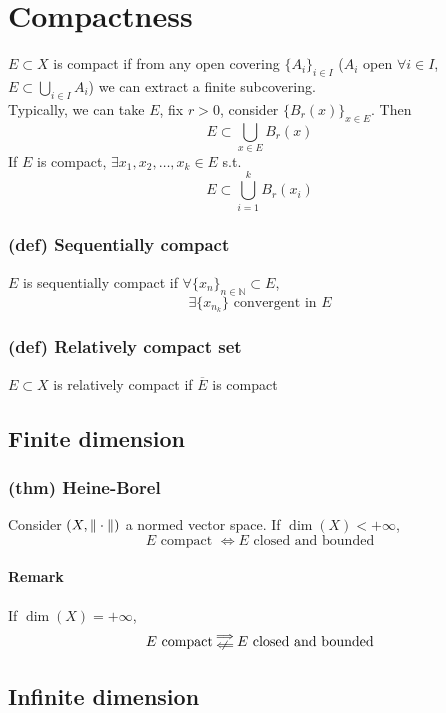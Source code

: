 \section{Compactness}
$E\subset X$ is compact if from any open covering $\{ A_i\}_{i\in I}$ ($A_i$ open $\forall i\in I$, $E\subset \bigcup_{i\in I}A_i$) we can extract a finite subcovering.\\
Typically, we can take $E$, fix $r>0$, consider $\{ B_r(x)\}_{x\in E}$. Then $$E\subset \bigcup_{x\in E}B_r(x)$$
If $E$ is compact, $\exists x_1,x_2,\dots, x_k\in E$ s.t. $$E\subset \bigcup_{i=1}^k B_r(x_i)$$
\subsubsection{(def) Sequentially compact}
$E$ is sequentially compact if $\forall \{x_n\}_{n\in \mathbb N}\subset E$,
$$\exists \{ x_{n_k}\} \text{ convergent in }E$$
\subsubsection{(def) Relatively compact set}
$E\subset X$ is relatively compact if $\overline E$ is compact
\subsection{Finite dimension}
\subsubsection{(thm) Heine-Borel}
Consider $(X,\Vert \cdot \Vert )$ a normed vector space. If $\dim (X)<+\infty$,
$$E \text{ compact }\iff E \text{ closed and bounded}$$
\paragraph{Remark}
If $\dim(X)=+\infty$,
$$E\text{ compact}\substack{\implies\\ \centernot\impliedby} E\text{ closed and bounded}$$
\subsection{Infinite dimension}
